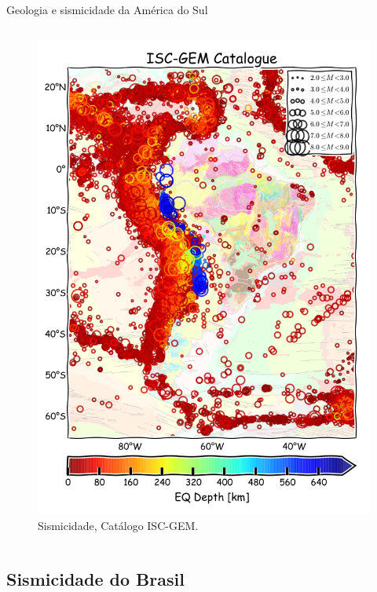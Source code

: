 \documentclass[ucs,8pt]{beamer}
\begin{document}
\begin{frame}{Geologia e sismicidade da América do Sul}
\begin{columns}[T]
\begin{column}[T]{0.49\textwidth}
\begin{figure}[T]
		  \includegraphics[width=.85\textwidth]{seismicity_sa} 
		  \caption{Sismicidade, Catálogo ISC-GEM.}
		  \label{fig:sa_seis} 
		\end{figure}
	\end{column}
\end{columns}

\end{frame}



\subsection{Sismicidade do Brasil}
\end{document}
